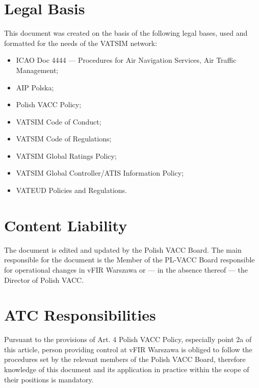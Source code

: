 \section{Legal Basis}
This document was created on the basis of the following legal bases, used and formatted for the needs of the VATSIM network:
\begin{itemize}
    \item ICAO Doc 4444 --- Procedures for Air Navigation Services, Air Traffic Management;
    \item AIP Polska;
    \item Polish VACC Policy;
    \item VATSIM Code of Conduct;
    \item VATSIM Code of Regulations;
    \item VATSIM Global Ratings Policy;
    \item VATSIM Global Controller/ATIS Information Policy;
    \item VATEUD Policies and Regulations.
\end{itemize}

\section{Content Liability}
The document is edited and updated by the Polish VACC Board. The main responsible for the document is the Member of the PL-VACC Board responsible for operational changes in vFIR Warszawa or --- in the absence thereof --- the Director of Polish VACC\@.

\section{ATC Responsibilities}
Pursuant to the provisions of Art. 4 Polish VACC Policy, especially point 2a of this article, person providing control at vFIR Warszawa is obliged to follow the procedures set by the relevant members of the Polish VACC Board, therefore knowledge of this document and its application in practice within the scope of their positions is mandatory.